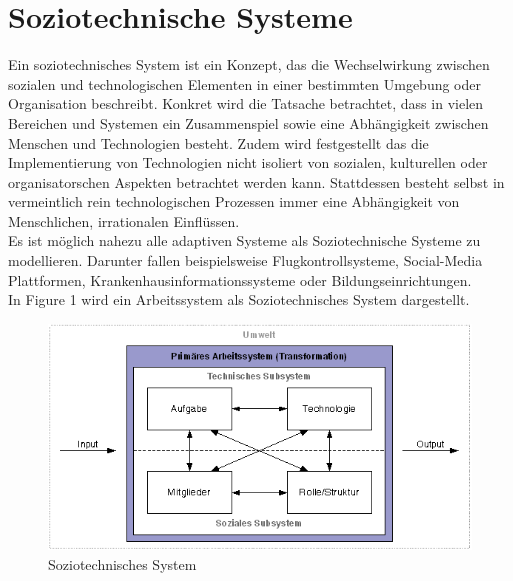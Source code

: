 \documentclass[journal=tosc,final]{iacrtrans}
\begin{document}
\section{Soziotechnische Systeme}
Ein soziotechnisches System ist ein Konzept, das die Wechselwirkung zwischen sozialen und technologischen Elementen in einer bestimmten Umgebung oder Organisation beschreibt. Konkret wird die Tatsache betrachtet, dass in vielen Bereichen und Systemen ein Zusammenspiel sowie eine Abhängigkeit zwischen Menschen und Technologien besteht. Zudem wird festgestellt das die Implementierung von Technologien nicht isoliert von sozialen, kulturellen oder organisatorschen Aspekten betrachtet werden kann. Stattdessen besteht selbst in vermeintlich rein technologischen Prozessen immer eine Abhängigkeit von Menschlichen, irrationalen Einflüssen.\\
Es ist möglich nahezu alle adaptiven Systeme als Soziotechnische Systeme zu modellieren. Darunter fallen beispielsweise Flugkontrollsysteme, Social-Media Plattformen, Krankenhausinformationssysteme oder Bildungseinrichtungen.\\
In Figure 1 wird ein Arbeitssystem als Soziotechnisches System dargestellt.
\begin{figure}[h]
\caption{Soziotechnisches System}
\begin{center}
 \includegraphics[scale=0.5]{sozio.png}
\end{center}
\end{figure}
\end{document}
